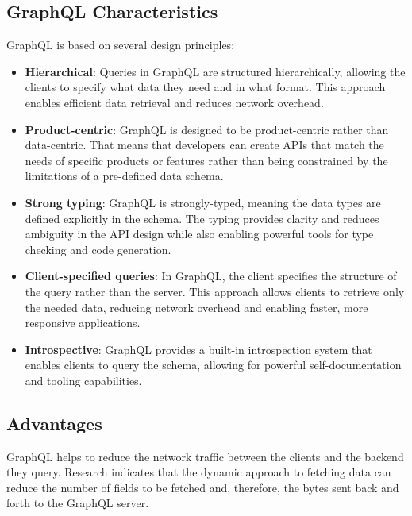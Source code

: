 \subsection{GraphQL Characteristics}\label{subsection:background:graphql:graphql-characteristics}

GraphQL is based on several design principles: \cite{misc:-:background:graphql:graphql-specification}

\begin{itemize}
    \item \textbf{Hierarchical}: Queries in GraphQL are structured hierarchically, allowing the clients to specify what data they need and in what format. This approach enables efficient data retrieval and reduces network overhead.

    \item \textbf{Product-centric}: GraphQL is designed to be product-centric rather than data-centric. That means that developers can create \acp{API} that match the needs of specific products or features rather than being constrained by the limitations of a pre-defined data schema.

    \item \textbf{Strong typing}: GraphQL is strongly-typed, meaning the data types are defined explicitly in the schema. The typing provides clarity and reduces ambiguity in the \ac{API} design while also enabling powerful tools for type checking and code generation.

    \item \textbf{Client-specified queries}: In GraphQL, the client specifies the structure of the query rather than the server. This approach allows clients to retrieve only the needed data, reducing network overhead and enabling faster, more responsive applications.

    \item \textbf{Introspective}: GraphQL provides a built-in introspection system that enables clients to query the schema, allowing for powerful self-documentation and tooling capabilities.
\end{itemize}

\subsection{Advantages}\label{subsection:background:graphql:graphql-advantages}

GraphQL helps to reduce the network traffic between the clients and the backend they query. Research indicates that the dynamic approach to fetching data can reduce the number of fields to be fetched and, therefore, the bytes sent back and forth to the GraphQL server. \cite{inprocessdings:2019:background:graphql:migration-to-graphql}

